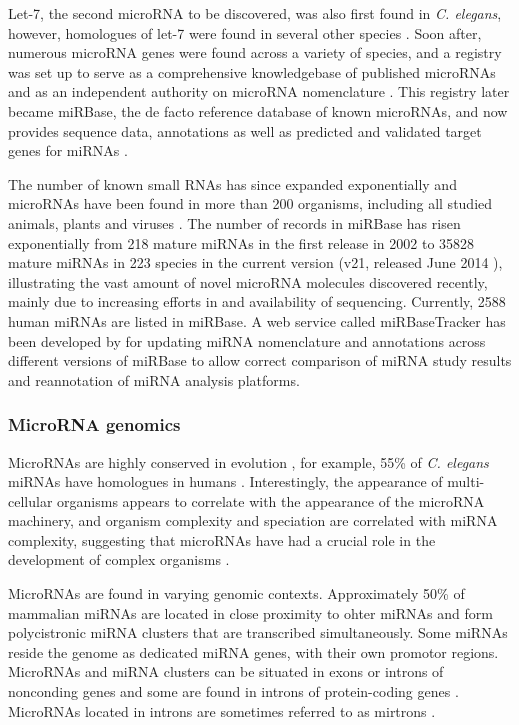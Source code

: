 Let-7, the second microRNA to be discovered, was also first found in \emph{C.
elegans}, however, homologues of let-7 were found in several other species
\citep{Pasquinelli2000}. Soon after, numerous microRNA genes were found across
a variety of species, and a registry was set up to serve as a comprehensive
knowledgebase of published microRNAs and as an independent authority on
microRNA nomenclature \citep{GriffithsJones2004}. This registry later became
miRBase, the de facto reference database of known microRNAs, and now provides
sequence data, annotations as well as predicted and validated target genes for
miRNAs \citep{Kozomara2014}.

The number of known small RNAs has since expanded
exponentially and microRNAs have been found in more than 200 organisms, including
all studied animals, plants \citep{JonesRhoades2006} and viruses \citep{Grundhoff2011}. 
The number of records in miRBase has risen exponentially
from %
218 mature miRNAs in the first release in 2002 to %
35828 mature miRNAs in 223 species in the current version (v21,
released June 2014 \citep{VanPeer2014,MiRBaseWeb}), illustrating the vast
amount of novel microRNA molecules discovered recently, mainly due to
increasing efforts in and availability of sequencing.
Currently, 2588 human miRNAs are listed in miRBase. A web service called
miRBaseTracker has been developed by \citet{VanPeer2014} for updating
miRNA nomenclature and annotations across different versions of miRBase to
allow correct comparison of miRNA study results and reannotation of miRNA
analysis platforms.



\subsubsection{MicroRNA genomics}\label{microrna-genomics}

MicroRNAs are highly conserved in evolution \citep{Bartel2004}, for example,
55\% of \emph{C. elegans} miRNAs have homologues in humans
\citep{IbanezVentoso2008}. Interestingly, the
appearance of multi-cellular organisms appears to correlate with the
appearance of the microRNA machinery, and organism complexity and speciation
are correlated with miRNA complexity, suggesting that microRNAs have had a
crucial role in the development of complex organisms \citep{Lee2007}.

MicroRNAs are found in varying genomic contexts. Approximately 50\% of
mammalian miRNAs are located in close proximity to ohter miRNAs and form
polycistronic miRNA clusters that are transcribed simultaneously. Some miRNAs
reside the genome as dedicated miRNA genes, with their own promotor regions.
\citep{Kim2009} MicroRNAs and miRNA clusters can be situated in exons or
introns of nonconding genes and some are found in introns of protein-coding genes
\citep{Du2005}. MicroRNAs located in introns are sometimes referred to as
mirtrons \citep{Ruby2007}.

